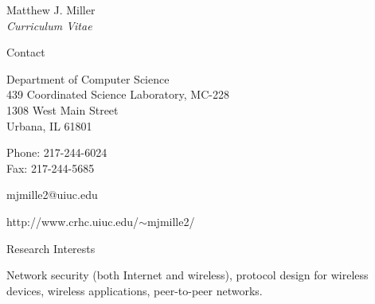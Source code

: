 \documentclass[10pt]{article}
\begin{document}


\newlength{\oldcvlabelwidth}
\renewcommand*{\cvbibname}{}

\begin{cv}{Matthew J. Miller\\{\large \itshape Curriculum Vitae}}

\begin{cvlist}{Contact}
	\item
	Department of Computer Science\\
	439 Coordinated Science Laboratory, MC-228\\
	1308 West Main Street\\
	Urbana, IL 61801
	\item Phone: 217-244-6024\\
	Fax: 217-244-5685
	\item mjmille2@uiuc.edu
	\item http://www.crhc.uiuc.edu/$\sim$mjmille2/
\end{cvlist}

\begin{cvlist}{Research Interests}
	\item Network security (both Internet and wireless), 
	protocol design for wireless devices,
	wireless applications, peer-to-peer networks.
\end{cvlist}


\end{cv}
\end{document}
